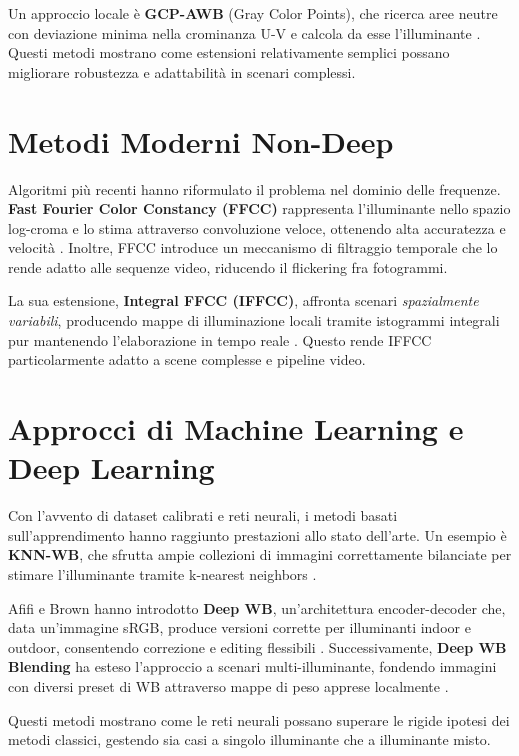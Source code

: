 Un approccio locale è \textbf{GCP-AWB} (Gray Color Points), che ricerca aree neutre con deviazione minima nella crominanza U-V e calcola da esse l'illuminante \cite{huo_robust_2006}. Questi metodi mostrano come estensioni relativamente semplici possano migliorare robustezza e adattabilità in scenari complessi.

\section{Metodi Moderni Non-Deep}

Algoritmi più recenti hanno riformulato il problema nel dominio delle frequenze. \textbf{Fast Fourier Color Constancy (FFCC)} rappresenta l'illuminante nello spazio log-croma e lo stima attraverso convoluzione veloce, ottenendo alta accuratezza e velocità \cite{barron_fast_2017}. Inoltre, FFCC introduce un meccanismo di filtraggio temporale che lo rende adatto alle sequenze video, riducendo il flickering fra fotogrammi.

La sua estensione, \textbf{Integral FFCC (IFFCC)}, affronta scenari \textit{spazialmente variabili}, producendo mappe di illuminazione locali tramite istogrammi integrali pur mantenendo l'elaborazione in tempo reale \cite{wei_integral_2025}. Questo rende IFFCC particolarmente adatto a scene complesse e pipeline video.

\section{Approcci di Machine Learning e Deep Learning}

Con l'avvento di dataset calibrati e reti neurali, i metodi basati sull'apprendimento hanno raggiunto prestazioni allo stato dell'arte. Un esempio è \textbf{KNN-WB}, che sfrutta ampie collezioni di immagini correttamente bilanciate per stimare l'illuminante tramite k-nearest neighbors \cite{afifi_deep_2020}. 

Afifi e Brown hanno introdotto \textbf{Deep WB}, un'architettura encoder-decoder che, data un'immagine sRGB, produce versioni corrette per illuminanti indoor e outdoor, consentendo correzione e editing flessibili \cite{afifi_deep_2020}. Successivamente, \textbf{Deep WB Blending} ha esteso l'approccio a scenari multi-illuminante, fondendo immagini con diversi preset di WB attraverso mappe di peso apprese localmente \cite{afifi_auto_2022}.

Questi metodi mostrano come le reti neurali possano superare le rigide ipotesi dei metodi classici, gestendo sia casi a singolo illuminante che a illuminante misto.

